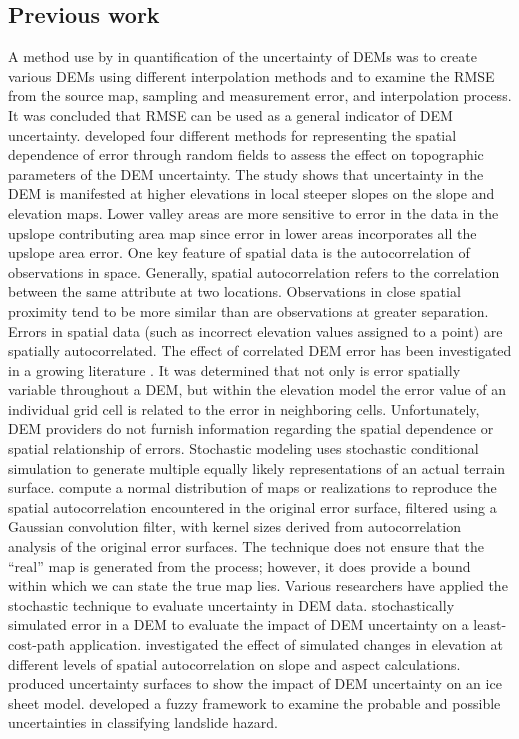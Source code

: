 \documentclass[a4paper,fleqn]{article}
\begin{document}
\subsection{Previous work}

A method use by \citep{Qihao_Weng} in quantification of the
uncertainty of DEMs was to create various DEMs using different
interpolation methods and to examine the RMSE from the source map,
sampling and measurement error, and interpolation process. It was
concluded that RMSE can be used as a general indicator of DEM
uncertainty.  \citet{Suzanne_Wechsler} developed four different
methods for representing the spatial dependence of error through
random fields to assess the effect on topographic parameters of the
DEM uncertainty. The study shows that uncertainty in the DEM is
manifested at higher elevations in local steeper slopes on the slope
and elevation maps.  Lower valley areas are more sensitive to error in
the data in the upslope contributing area map since error in lower
areas incorporates all the upslope area error.
One key feature of spatial data is the autocorrelation of observations
in space.  Generally, spatial autocorrelation refers to the
correlation between the same attribute at two locations. Observations
in close spatial proximity tend to be more similar than are
observations at greater separation. Errors in spatial data (such as
incorrect elevation values assigned to a point) are spatially
autocorrelated. The effect of correlated DEM error has been
investigated in a growing literature \citep{Fisher_1991,
Goodchild_1992}. It was determined that not only is error spatially
variable throughout a DEM, but within the elevation model the error
value of an individual grid cell is related to the error in
neighboring cells. Unfortunately, DEM providers do not furnish
information regarding the spatial dependence or spatial relationship
of errors.
Stochastic modeling uses stochastic conditional simulation to generate
multiple equally likely representations of an actual terrain
surface. \citet{Hunter_Goodchild_1997, Ehlschlaeger_1996} compute a
normal distribution of maps or realizations to reproduce the spatial
autocorrelation encountered in the original error surface, filtered
using a Gaussian convolution filter, with kernel sizes derived from
autocorrelation analysis of the original error surfaces. The technique
does not ensure that the ``real'' map is generated from the process;
however, it does provide a bound within which we can state the true
map lies.
Various researchers have applied the stochastic technique to evaluate
uncertainty in DEM data. \citet{Ehlschlaeger_1996} stochastically
simulated error in a DEM to evaluate the impact of DEM uncertainty on
a least-cost-path application. \citet{Hunter_Goodchild_1997}
investigated the effect of simulated changes in elevation at different
levels of spatial autocorrelation on slope and aspect
calculations. \citet{Felix_Hebeler} produced uncertainty surfaces to
show the impact of DEM uncertainty on an ice sheet
model. \citet{Amii_Darnell} developed a fuzzy framework to examine the
probable and possible uncertainties in classifying landslide hazard.
\end{document}
